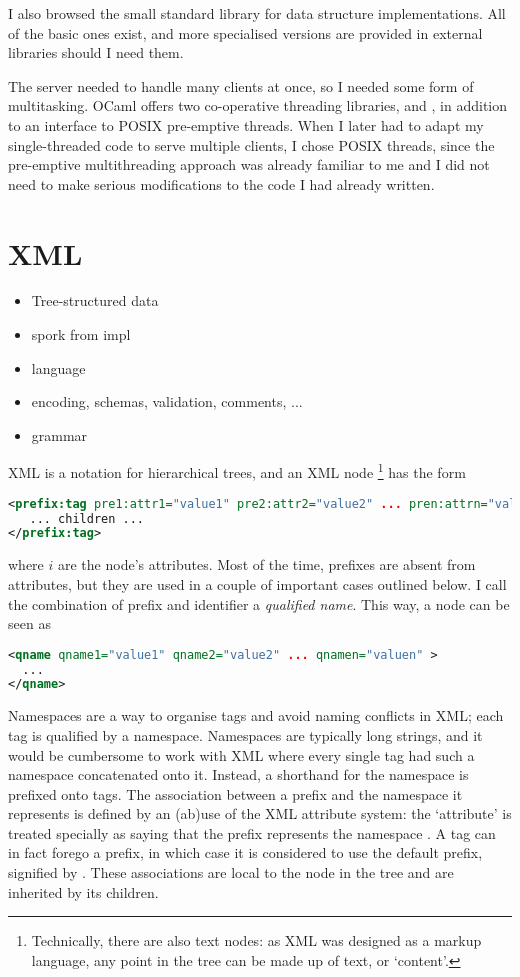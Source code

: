 I also browsed the small standard library for data structure implementations. All of the basic ones exist, and more specialised versions are provided in external libraries should I need them.

The server needed to handle many clients at once, so I needed some form of multitasking. OCaml offers two co-operative threading libraries,  and , in addition to an interface to POSIX pre-emptive threads. When I later had to adapt my single-threaded code to serve multiple clients, I chose POSIX threads, since the pre-emptive multithreading approach was already familiar to me and I did not need to make serious modifications to the code I had already written.

\section{XML}
\begin{itemize}
  \item Tree-structured data
  \item spork from impl
  \item language
  \item encoding, schemas, validation, comments, ...
  \item grammar
\end{itemize}

XML is a notation for hierarchical trees, and an XML node \footnote{Technically, there are also text nodes: as XML was designed as a markup language, any point in the tree can be made up of text, or `content'.} has the form
\begin{lstlisting}[language=xml]
<prefix:tag pre1:attr1="value1" pre2:attr2="value2" ... pren:attrn="valuen" >
   ... children ...
</prefix:tag>
\end{lstlisting}
where \(i\) are the node's attributes. Most of the time, prefixes are absent from attributes, but they are used in a couple of important cases outlined below. I call the combination of prefix and identifier a \emph{qualified name}. This way, a node can be seen as
\begin{lstlisting}[language=xml]
<qname qname1="value1" qname2="value2" ... qnamen="valuen" >
  ...
</qname>
\end{lstlisting}

Namespaces are a way to organise tags and avoid naming conflicts in XML; each tag is qualified by a namespace. Namespaces are typically long strings, and it would be cumbersome to work with XML where every single tag had such a namespace concatenated onto it. Instead, a shorthand for the namespace is prefixed onto tags. The association between a prefix and the namespace it represents is defined by an (ab)use of the XML attribute system: the `attribute'  is treated specially as saying that the prefix  represents the namespace . A tag can in fact forego a prefix, in which case it is considered to use the default prefix, signified by . These associations are local to the node in the tree and are inherited by its children.

